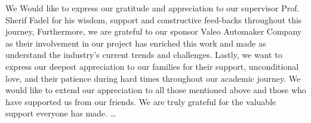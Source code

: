 \documentclass[
12pt,
oneside, 
onehalfspacing, 
nolistspacing, 
parskip, 
chapterinoneline, 
]{AASTCOMPUTER}
\author{Moustafa Mohamed Wahdan}
\begin{document}
\frontmatter 
\pagestyle{plain} 

\titlep

\declarationp

\examinersp


\begin{acknowledgmentsp}
We Would like to express our gratitude and appreciation to our supervisor Prof. Sherif Fadel for his wisdom, support and constructive feed-backs throughout this journey, Furthermore, we are grateful to our sponsor Valeo Automaker Company as their involvement in our project has enriched this work and made as understand the industry's current trends and challenges.
Lastly, we want to express our deepest appreciation to our families for their support, unconditional love, and their patience during hard times throughout our academic journey. 
We would like to extend our appreciation to all those mentioned above and those who have supported us from our friends. We are truly grateful for the valuable support everyone has made.
\ldots
\end{acknowledgmentsp}
\end{document}
